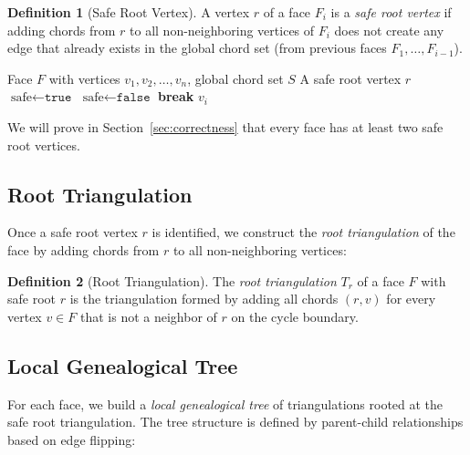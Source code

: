 \documentclass[12pt,a4paper]{article}
\theoremstyle{definition}
\newtheorem{definition}{Definition}
\theoremstyle{remark}
\begin{document}
\begin{definition}[Safe Root Vertex]
A vertex $r$ of a face $F_i$ is a \emph{safe root vertex} if adding chords from $r$ to all non-neighboring vertices of $F_i$ does not create any edge that already exists in the global chord set (from previous faces $F_1, \ldots, F_{i-1}$).
\end{definition}

\begin{algorithm}
\caption{Finding a Safe Root Vertex}
\label{alg:safe_root}
\begin{algorithmic}[1]
\Require Face $F$ with vertices $v_1, v_2, \ldots, v_n$, global chord set $S$
\Ensure A safe root vertex $r$
    \State $\text{safe} \gets \texttt{true}$
            \State $\text{safe} \gets \texttt{false}$
            \State \textbf{break}
        \EndIf
    \EndFor
        \State \Return $v_i$
    \EndIf
\EndFor
\end{algorithmic}
\end{algorithm}

We will prove in Section~\ref{sec:correctness} that every face has at least two safe root vertices.

\subsection{Root Triangulation}

Once a safe root vertex $r$ is identified, we construct the \emph{root triangulation} of the face by adding chords from $r$ to all non-neighboring vertices:

\begin{definition}[Root Triangulation]
The \emph{root triangulation} $T_r$ of a face $F$ with safe root $r$ is the triangulation formed by adding all chords $(r, v)$ for every vertex $v \in F$ that is not a neighbor of $r$ on the cycle boundary.
\end{definition}

\subsection{Local Genealogical Tree}

For each face, we build a \emph{local genealogical tree} of triangulations rooted at the safe root triangulation. The tree structure is defined by parent-child relationships based on edge flipping:
\end{document}

